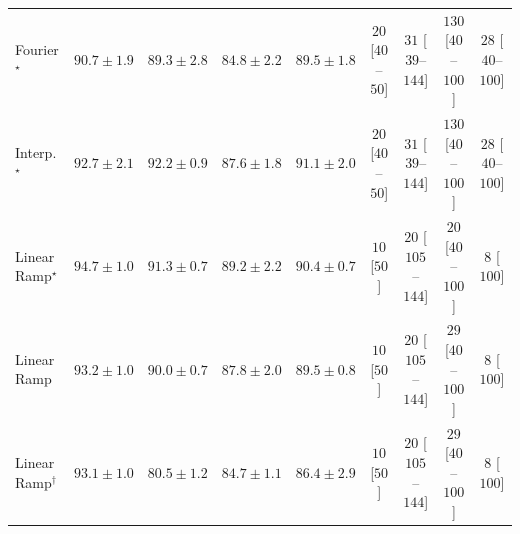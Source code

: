 \begin{tabular}{l|cccc|cccc|}
Fourier$^\star$ & {\cellcolor[HTML]{006837}} \color[HTML]{F1F1F1} $90.7\pm 1.9$ & {\cellcolor[HTML]{096F3A}} \color[HTML]{F1F1F1} $89.3\pm 2.8$ & {\cellcolor[HTML]{248644}} \color[HTML]{F1F1F1} $84.8\pm 2.2$ & {\cellcolor[HTML]{086E3A}} \color[HTML]{F1F1F1} $89.5\pm 1.8$ & {\cellcolor[HTML]{FFF4F0}} \color[HTML]{000000} $20$ [$40$--$50$] & {\cellcolor[HTML]{FFF2EE}} \color[HTML]{000000} $31$ [$39$--$144$] & {\cellcolor[HTML]{FDD9D6}} \color[HTML]{000000} $130$ [$40$--$100$] & {\cellcolor[HTML]{FFF3EF}} \color[HTML]{000000} $28$ [$40$--$100$] \\
Interp.$^\star$ & {\cellcolor[HTML]{005C32}} \color[HTML]{F1F1F1} $92.7\pm 2.1$ & {\cellcolor[HTML]{005F34}} \color[HTML]{F1F1F1} $92.2\pm 0.9$ & {\cellcolor[HTML]{13773D}} \color[HTML]{F1F1F1} $87.6\pm 1.8$ & {\cellcolor[HTML]{006636}} \color[HTML]{F1F1F1} $91.1\pm 2.0$ & {\cellcolor[HTML]{FFF4F0}} \color[HTML]{000000} $20$ [$40$--$50$] & {\cellcolor[HTML]{FFF2EE}} \color[HTML]{000000} $31$ [$39$--$144$] & {\cellcolor[HTML]{FDD9D6}} \color[HTML]{000000} $130$ [$40$--$100$] & {\cellcolor[HTML]{FFF3EF}} \color[HTML]{000000} $28$ [$40$--$100$] \\
Linear Ramp$^\star$ & {\cellcolor[HTML]{00502D}} \color[HTML]{F1F1F1} $94.7\pm 1.0$ & {\cellcolor[HTML]{006536}} \color[HTML]{F1F1F1} $91.3\pm 0.7$ & {\cellcolor[HTML]{096F3A}} \color[HTML]{F1F1F1} $89.2\pm 2.2$ & {\cellcolor[HTML]{026A38}} \color[HTML]{F1F1F1} $90.4\pm 0.7$ & {\cellcolor[HTML]{FFF7F3}} \color[HTML]{000000} $10$ [$50$] & {\cellcolor[HTML]{FFF4F0}} \color[HTML]{000000} $20$ [$105$--$144$] & {\cellcolor[HTML]{FFF4F0}} \color[HTML]{000000} $20$ [$40$--$100$] & {\cellcolor[HTML]{FFF7F3}} \color[HTML]{000000} $8$ [$100$] \\
Linear Ramp & {\cellcolor[HTML]{005931}} \color[HTML]{F1F1F1} $93.2\pm 1.0$ & {\cellcolor[HTML]{056C39}} \color[HTML]{F1F1F1} $90.0\pm 0.7$ & {\cellcolor[HTML]{12763D}} \color[HTML]{F1F1F1} $87.8\pm 2.0$ & {\cellcolor[HTML]{086E3A}} \color[HTML]{F1F1F1} $89.5\pm 0.8$ & {\cellcolor[HTML]{FFF7F3}} \color[HTML]{000000} $10$ [$50$] & {\cellcolor[HTML]{FFF4F0}} \color[HTML]{000000} $20$ [$105$--$144$] & {\cellcolor[HTML]{FFF2EE}} \color[HTML]{000000} $29$ [$40$--$100$] & {\cellcolor[HTML]{FFF7F3}} \color[HTML]{000000} $8$ [$100$] \\
Linear Ramp$^\dagger$ & {\cellcolor[HTML]{005A31}} \color[HTML]{F1F1F1} $93.1\pm 1.0$ & {\cellcolor[HTML]{3BA358}} \color[HTML]{F1F1F1} $80.5\pm 1.2$ & {\cellcolor[HTML]{258745}} \color[HTML]{F1F1F1} $84.7\pm 1.1$ & {\cellcolor[HTML]{1A7D40}} \color[HTML]{F1F1F1} $86.4\pm 2.9$ & {\cellcolor[HTML]{FFF7F3}} \color[HTML]{000000} $10$ [$50$] & {\cellcolor[HTML]{FFF4F0}} \color[HTML]{000000} $20$ [$105$--$144$] & {\cellcolor[HTML]{FFF2EE}} \color[HTML]{000000} $29$ [$40$--$100$] & {\cellcolor[HTML]{FFF7F3}} \color[HTML]{000000} $8$ [$100$] \\

\end{tabular}
